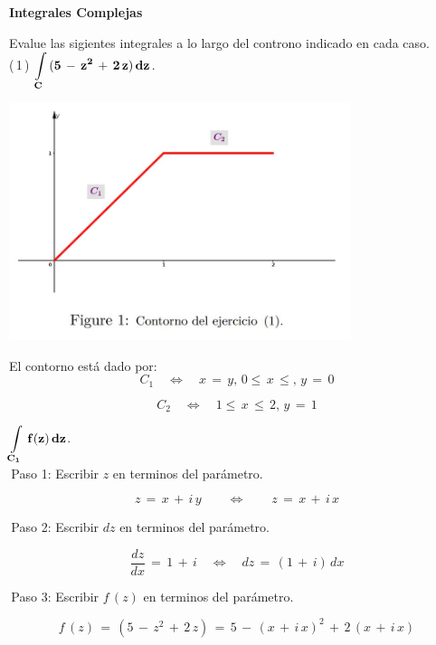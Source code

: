 \documentclass[a4paper,11pt,openany]{book}
\begin{document}
\newpage


\graphicspath{ {images/} }

\begin{center}
\textbf{Integrales Complejas}
\end{center}

Evalue las sigientes integrales a lo largo del controno indicado en cada caso.\\

\textcolor{ao(english)}{(\,1\,)} $\bf{\displaystyle\int\limits_{C}\,(5\,-\,z^{2}\,+\,2\,z)\,dz}$.

\begin{center}
     \includegraphics[width=10cm]{figura-1.JPG}
\end{center}


El contorno está dado por:\\

$$C_{1} \quad\iff\quad x\,=\,y,\,0\leq\,x\,\leq,\,y\,=\,0$$

$$C_{2} \quad\iff\quad 1\leq\,x\,\leq\,2,\,y\,=\,1$$

$\bf{\displaystyle\int\limits_{C_{1}}\,f(z)\,dz}$.\\

\textcolor{ao(english)}{\,Paso 1:} Escribir $z$ en terminos del parámetro.

$$z\,=\,x\,+\,i\,y \qquad\iff\qquad z\,=\,x\,+\,i\,x$$

\textcolor{ao(english)}{\,Paso 2:} Escribir $dz$ en terminos del parámetro.

$$\dfrac{dz}{dx}\,=\,1\,+\,i \quad\iff\quad dz\,=\,(1\,+\,i)\,dx$$

\textcolor{ao(english)}{\,Paso 3:} Escribir $f\,(z)$ en terminos del parámetro.

$$f\,(z)\,=\,(5\,-\,z^{2}\,+\,2\,z)\,=\,5\,-\,(x\,+\,i\,x)^{2}\,+\,2\,(x\,+\,i\,x)$$
\end{document}
